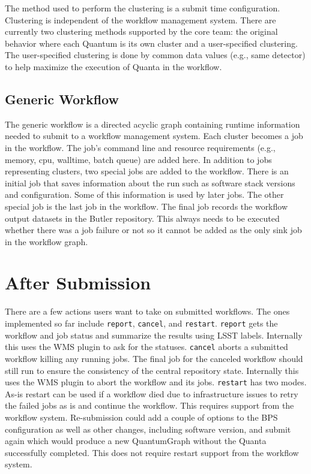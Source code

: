 \documentclass[11pt,twoside]{article}
\begin{document}
The method used to perform the clustering is a submit time configuration.
Clustering is independent of the workflow management system.  There
are currently two clustering methods supported by the core team: the
original behavior where each Quantum is its own cluster and a user-specified
clustering.  The user-specified clustering is done by common data values
(e.g., same detector) to help maximize the execution of Quanta in the
workflow.

\subsection{Generic Workflow} \label{generic_workflow}
The generic workflow is a directed acyclic graph containing runtime
information needed to submit to a workflow management system.  Each
cluster becomes a job in the workflow.  The job's command line and
resource requirements (e.g., memory, cpu, walltime, batch queue) are
added here.  In addition to jobs representing clusters, two special jobs
are added to the workflow.  There is an initial job that saves information
about the run such as software stack versions and configuration.  Some
of this information is used by later jobs.  The other special job is the
last job in the workflow.  The final job records the workflow output
datasets in the Butler repository.  This always needs to be executed
whether there was a job failure or not so it cannot be added as the
only sink job in the workflow graph.

\section{After Submission}
There are a few actions users want to take on submitted workflows.  The
ones implemented so far include \texttt{report}, \texttt{cancel}, and \texttt{restart}.
\texttt{report} gets the workflow and job status and summarize
the results using LSST labels.  Internally this uses the WMS plugin to
ask for the statuses.
\texttt{cancel} aborts a submitted workflow killing any running
jobs.  The final job for the canceled workflow should still run to ensure
the consistency of the central repository state.  Internally this uses
the WMS plugin to abort the workflow and its jobs.
\texttt{restart} has two modes.
As-is restart can be used if a workflow died due to infrastructure
issues to retry the failed jobs as is and continue the workflow.
This requires support from the workflow system.
Re-submission could add a couple of options to the BPS configuration
as well as other changes, including software version, and submit again
which would produce a new QuantumGraph without the Quanta successfully
completed.  This does not require restart support from the workflow
system.
\end{document}
